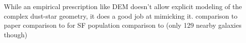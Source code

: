 











While an empirical prescription like DEM doesn't allow explicit modeling of the
complex dust-star geometry, it does a good job at mimicking it. 
comparison to \cite{narayanan2018} paper 
comparison to \cite{salim2018} for SF population  
comparison to \cite{leja2017} (only 129 nearby galaxies though) 

